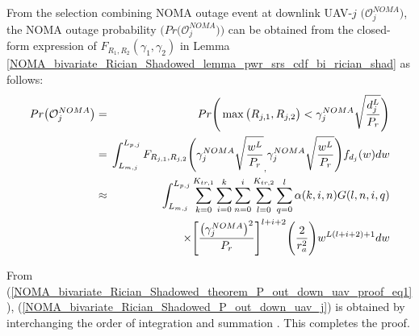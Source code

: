 From the selection combining NOMA outage event at downlink UAV-$j$ $\big(\mathcal{O}_{j}^{NOMA}\big)$, the NOMA outage probability $\big(Pr\big(\mathcal{O}_{j}^{NOMA}\big)\big)$ can be obtained from the closed-form expression of $F_{R_1,R_2}(\gamma_1,\gamma_2)$ in Lemma \ref{NOMA_bivariate_Rician_Shadowed_lemma_pwr_srs_cdf_bi_rician_shad} as follows:
\begin{eqnarray}
Pr\big(\mathcal{O}_{j}^{NOMA}\big) & = & \hspace{-0.2cm} Pr\Bigg(\max\big(R_{j,1},R_{j,2}\big) < \gamma_j^{NOMA} \sqrt{\frac{d_{j}^{L}}{P_r}}\Bigg) \nonumber \\
 & = & \hspace{-0.2cm} \int_{L_{m,j}}^{L_{p,j}} F_{R_{j,1},R_{j,2}}\Bigg(\gamma_j^{NOMA} \sqrt{\frac{w^{L}}{P_r}}_,\gamma_j^{NOMA} \sqrt{\frac{w^{L}}{P_r}}\Bigg) f_{d_j}(w) dw \nonumber \\
 & \approx & \hspace{-0.2cm} \int_{L_{m,j}}^{L_{p,j}} \sum_{k=0}^{K_{tr,1}} \sum_{i=0}^{k} \sum_{n=0}^{i} \sum_{l=0}^{K_{tr,2}} \sum_{q=0}^{l} \alpha(k,i,n) G(l,n,i,q) \nonumber \\
 & & \hspace{1.5cm} \times \Bigg[\frac{\big(\gamma_j^{NOMA}\big)^2}{P_r}\Bigg]^{l+i+2} \Bigg(\frac{2}{r_a^2}\Bigg) w^{L(l+i+2)+1} dw \label{NOMA_bivariate_Rician_Shadowed_theorem_P_out_down_uav_proof_eq1}
\end{eqnarray}

From (\ref{NOMA_bivariate_Rician_Shadowed_theorem_P_out_down_uav_proof_eq1}), (\ref{NOMA_bivariate_Rician_Shadowed_P_out_down_uav_j}) is obtained by interchanging the order of integration and summation \cite{amann2005analysis,gradshteyn2014table}. This completes the proof.

